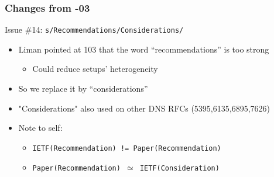 \documentclass[11pt,show 
notes,notheorems,noamsthm,blank]{beamer} %
\begin{document}
\begin{frame}
\frametitle{Changes from -03}
\begin{block}{ Issue \#14: \texttt{s/Recommendations/Considerations/}}
\begin{itemize}
 \item Liman pointed at 103 that the word ``recommendations'' is too strong
 \begin{itemize}

 \item Could reduce  setups' heterogeneity 
 \end{itemize}
 \item So we replace it by ``considerations''
 \item "Considerations" also used on other DNS RFCs (5395,6135,6895,7626)

  \item Note to self: 
  \begin{itemize}
   \item \texttt{IETF(Recommendation) != Paper(Recommendation)} 
   \item \texttt{Paper(Recommendation) $\simeq$ IETF(Consideration)}
 
  \end{itemize}

\end{itemize}

 
\end{block}



\end{frame}
\end{document}
